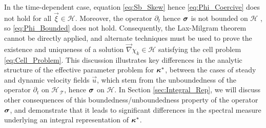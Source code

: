 \documentclass[11pt]{amsart}
\newcommand{\Tc}{\mathcal{T}}
\newcommand{\Hs}{\mathscr{H}}
\newcommand\bsig{\mbox{\boldmath${\sigma}$}}
\newcommand\bkappa{\mbox{\boldmath${\kappa}$}}
\begin{document}
In the time-dependent case, equation \eqref{eq:Sb_Skew} hence
\eqref{eq:Phi_Coercive} does not hold for all $\vec{\xi}\in\Hs$. Moreover, 
the operator $\partial_t$ hence $\bsig$ is not bounded on $\Hs$
\cite{Reed-1980,Stakgold:BVP:2000}, so \eqref{eq:Phi_Bounded} does not
hold. Consequently, the Lax-Milgram theorem cannot be directly
applied, and alternate techniques  
\cite{Friedman:1969:PDE,Friedman:1969:PDE:Parabolic} must be used to
prove the existence and uniqueness of a solution $\vec{\nabla}\chi_k\in\Hs$ 
satisfying the cell problem \eqref{eq:Cell_Problem}. This discussion
illustrates key differences in the analytic structure of the effective
parameter problem for $\bkappa^*$, between the cases of steady and
dynamic velocity fields $\vec{u}$, which stem from the unboundedness
of the operator $\partial_t$ on $\Hs_{\,\Tc}$, hence $\bsig$ on $\Hs$. In Section
\ref{sec:Integral_Rep}, we will discuss other consequences of this
boundedness/unboundedness property of the operator $\bsig$, and
demonstrate that it leads to significant differences in the spectral
measure underlying an  integral representation of $\bkappa^*$.     
\end{document}
